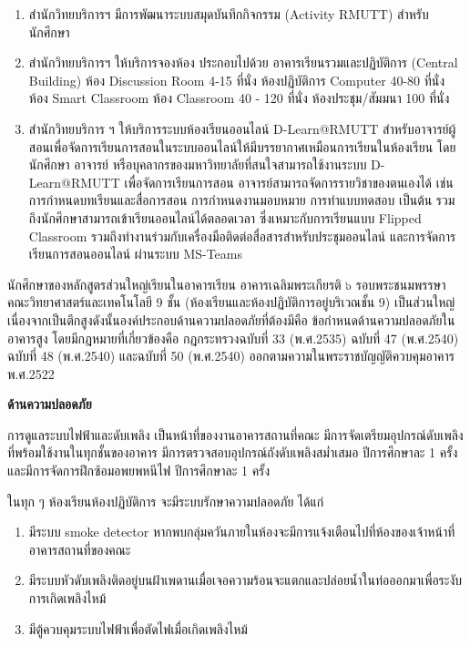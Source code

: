 \begin{enumerate}
\item สำนักวิทยบริการฯ มีการพัฒนาระบบสมุดบันทึกกิจกรรม (Activity RMUTT) สำหรับนักศึกษา
\item สำนักวิทยบริการฯ ให้บริการจองห้อง ประกอบไปด้วย อาคารเรียนรวมและปฏิบัติการ (Central Building)  ห้อง Discussion Room 4-15 ที่นั่ง ห้องปฏิบัติการ Computer 40-80 ที่นั่ง  ห้อง Smart Classroom ห้อง Classroom 40 - 120 ที่นั่ง  ห้องประชุม/สัมมนา 100 ที่นั่ง
\item สำนักวิทยบริการ ฯ ให้บริการระบบห้องเรียนออนไลน์ D-Learn@RMUTT สำหรับอาจารย์ผู้สอนเพื่อจัดการเรียนการสอนในระบบออนไลน์ให้มีบรรยากาศเหมือนการเรียนในห้องเรียน โดยนักศึกษา อาจารย์ หรือบุคลากรของมหาวิทยาลัยที่สนใจสามารถใช้งานระบบ D-Learn@RMUTT เพื่อจัดการเรียนการสอน อาจารย์สามารถจัดการรายวิชาของตนเองได้ เช่น การกำหนดบทเรียนและสื่อการสอน การกำหนดงานมอบหมาย การทำแบบทดสอบ เป็นต้น รวมถึงนักศึกษาสามารถเข้าเรียนออนไลน์ได้ตลอดเวลา ซึ่งเหมาะกับการเรียนแบบ Flipped Classroom รวมถึงทำงานร่วมกับเครื่องมือติดต่อสื่อสารสำหรับประชุมออนไลน์ และการจัดการเรียนการสอนออนไลน์ ผ่านระบบ MS-Teams
\end{enumerate}

\begin{doclist}
\end{doclist}



นักศึกษาของหลักสูตรส่วนใหญ่เรียนในอาคารเรียน อาคารเฉลิมพระเกียรติ ๖ รอบพระชนมพรรษา คณะวิทยาศาสตร์และเทคโนโลยี 9 ชั้น  (ห้องเรียนและห้องปฏิบัติการอยู่บริเวณชั้น 9) เป็นส่วนใหญ่  เนื่องจากเป็นตึกสูงดังนั้นองค์ประกอบด้านความปลอดภัยที่ต้องมีคือ ข้อกำหนดด้านความปลอดภัยในอาคารสูง โดยมีกฎหมายที่เกี่ยวข้องคือ
กฎกระทรวงฉบับที่ 33 (พ.ศ.2535) ฉบับที่ 47 (พ.ศ.2540) ฉบับที่ 48 (พ.ศ.2540) และฉบับที่ 50 (พ.ศ.2540) ออกตามความในพระราชบัญญัติควบคุมอาคาร พ.ศ.2522

{\bf ด้านความปลอดภัย}

การดูแลระบบไฟฟ้าและดับเพลิง เป็นหน้าที่ของงานอาคารสถานที่คณะ มีการจัดเตรียมอุปกรณ์ดับเพลิงที่พร้อมใช้งานในทุกชั้นของอาคาร มีการตรวจสอบอุปกรณ์ถังดับเพลิงสม่ำเสมอ ปีการศึกษาละ 1 ครั้งและมีการจัดการฝึกซ้อมอพยพหนีไฟ ปีการศึกษาละ 1 ครั้ง

ในทุก ๆ ห้องเรียนห้องปฏิบัติการ จะมีระบบรักษาความปลอดภัย ได้แก่
\begin{enumerate}
	\item มีระบบ smoke detector หากพบกลุ่มควันภายในห้องจะมีการแจ้งเตือนไปที่ห้องของเจ้าหน้าที่อาคารสถานที่ของคณะ
	\item มีระบบหัวดับเพลิงติดอยู่บนฝ้าเพดานเมื่อเจอความร้อนจะแตกและปล่อยน้ำในท่อออกมาเพื่อระงับการเกิดเพลิงไหม้
	\item มีตู้ควบคุมระบบไฟฟ้าเพื่อตัดไฟเมื่อเกิดเพลิงไหม้
\end{enumerate}

